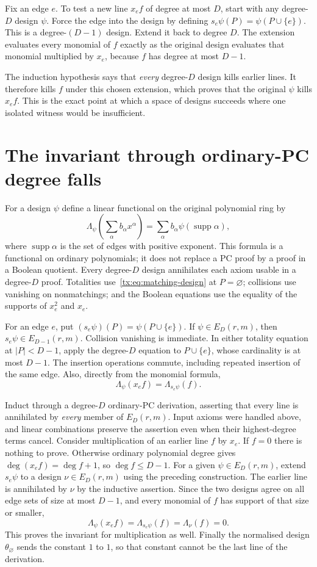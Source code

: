 \documentclass[11pt,a4paper,oneside,openany]{book}
\theoremstyle{definition}\newtheorem{definition}[theorem]{Definition}
\theoremstyle{remark}\newtheorem{remark}[theorem]{Remark}
\numberwithin{equation}{chapter}
\begin{document}
Fix an edge $e$. To test a new line $x_e f$ of degree at most $D$,
start with any degree-$D$ design $\psi$. Force the edge into the design
by defining $s_e\psi(P)=\psi(P\cup\{e\})$. This is a degree-$(D-1)$
design. Extend it back to degree $D$. The extension evaluates every
monomial of $f$ exactly as the original design evaluates that monomial
multiplied by $x_e$, because $f$ has degree at most $D-1$.

The induction hypothesis says that \emph{every} degree-$D$ design kills
earlier lines. It therefore kills $f$ under this chosen extension,
which proves that the original $\psi$ kills $x_e f$. This is the exact
point at which a space of designs succeeds where one isolated witness
would be insufficient.

\section{The invariant through ordinary-PC degree falls}

For a design $\psi$ define a linear functional on the original polynomial
ring by
\[
 \Lambda_\psi\!\left(\sum_\alpha b_\alpha x^\alpha\right)
      =\sum_\alpha b_\alpha\psi(\operatorname{supp}\alpha),
\]
where $\operatorname{supp}\alpha$ is the set of edges with positive
exponent.  This formula is a functional on ordinary polynomials; it
does not replace a PC proof by a proof in a Boolean quotient.
Every degree-$D$ design annihilates each axiom usable in a degree-$D$
proof.  Totalities use~\eqref{tx:eq:matching-design} at $P=\varnothing$;
collisions use vanishing on nonmatchings; and the Boolean equations
use the equality of the supports of $x_e^2$ and $x_e$.

For an edge $e$, put $(s_e\psi)(P)=\psi(P\cup\{e\})$.
If $\psi\in E_D(r,m)$, then $s_e\psi\in E_{D-1}(r,m)$.
Collision vanishing is immediate.  In either totality equation at
$|P|<D-1$, apply the degree-$D$ equation to $P\cup\{e\}$, whose
cardinality is at most $D-1$.  The insertion operations commute,
including repeated insertion of the same edge.  Also, directly from
the monomial formula,
\[
 \Lambda_\psi(x_ef)=\Lambda_{s_e\psi}(f).
\]

Induct through a degree-$D$ ordinary-PC derivation, asserting that every
line is annihilated by \emph{every} member of $E_D(r,m)$.  Input axioms
were handled above, and linear combinations preserve the assertion
even when their highest-degree terms cancel.  Consider multiplication
of an earlier line $f$ by $x_e$.  If $f=0$ there is nothing to prove.
Otherwise ordinary polynomial degree gives
$\deg(x_ef)=\deg f+1$, so $\deg f\leq D-1$.
For a given $\psi\in E_D(r,m)$, extend $s_e\psi$ to a design
$\nu\in E_D(r,m)$ using the preceding construction.  The earlier line
is annihilated by $\nu$ by the inductive assertion.  Since the two
designs agree on all edge sets of size at most $D-1$, and every monomial
of $f$ has support of that size or smaller,
\[
 \Lambda_\psi(x_ef)=\Lambda_{s_e\psi}(f)=\Lambda_\nu(f)=0.
\]
This proves the invariant for multiplication as well.  Finally the
normalised design $\theta_{\varnothing}$ sends the constant $1$ to $1$,
so that constant cannot be the last line of the derivation.
\end{document}
